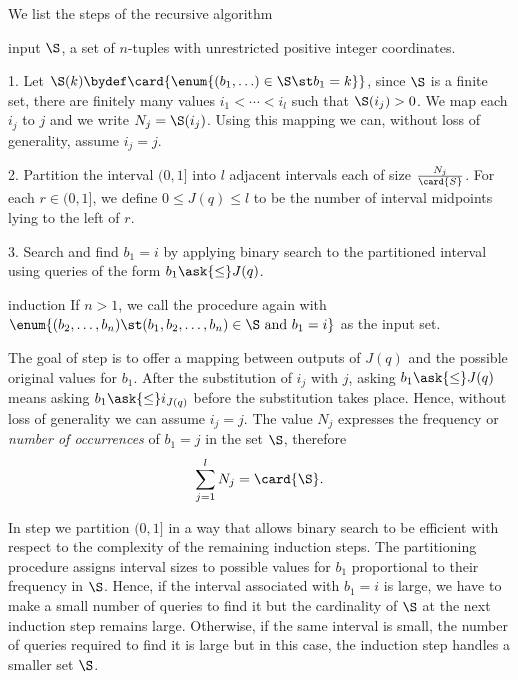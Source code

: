 We list the steps of the recursive algorithm
\begin{algorithm}

\item[input] $\S$, a set of $n$-tuples with unrestricted positive integer
coordinates.

\item[1.] Let $\S(k) \bydef \card{\enum{(b_1, \ldots) \in \S \st b_1 = k}}$,
since $\S$ is a finite set, there are finitely many values $i_1 < \cdots < i_l$
such that $\S(i_j) > 0$. We map each $i_j$ to $j$
and we write $N_j = \S(i_j)$. Using this mapping we can, without loss of
generality, assume \(i_j = j\).

\item[2.] Partition the interval $(0,1]$ into $l$ adjacent intervals each of
size $\frac{N_j}{\card{S}}$. For each $r \in (0,1]$, we define $0 \le J(q) \le
l$ to be the number of interval midpoints lying to the left of $r$.

\item[3.] Search and find $b_1 = i$ by applying binary search to the partitioned
interval using queries of the form \(b_1 \ask{\le} J(q)\).

\item[induction] If $n > 1$, we call the procedure again with\\
$\enum{(b_2, \ldots, b_n) \st (b_1, b_2, \ldots, b_n) \in \S \text{ and } b_1 =
i}$ as the input set.

\end{algorithm}

The goal of step  is to offer a mapping between outputs of $J(q)$ and
the possible original values for $b_1$. After the substitution of $i_j$ with
$j$, asking $b_1 \ask{\le} J(q)$ means asking $b_1 \ask{\le} i_{J(q)}$
before the substitution takes place. Hence, without loss of generality we can
assume \(i_j = j\). The value $N_j$ expresses the frequency or \emph{number of
occurrences} of $b_1 = j$ in the set $\S$, therefore
\begin{displaymath}
\sum_{j=1}^{l} N_j = \card{\S}.
\end{displaymath}

In step  we partition $(0,1]$ in a way that allows binary search to
be efficient with respect to the complexity of the remaining induction steps.
The partitioning procedure assigns interval sizes to possible values for
$b_1$ proportional to their frequency in $\S$. Hence, if the interval
associated with $b_1 = i$ is large, we have to make a small number of
queries to find it but the cardinality of $\S$ at the next induction step
remains large. Otherwise, if the same interval is small, the number of queries
required to find it is large but in this case, the induction step
handles a smaller set \(\S\).

